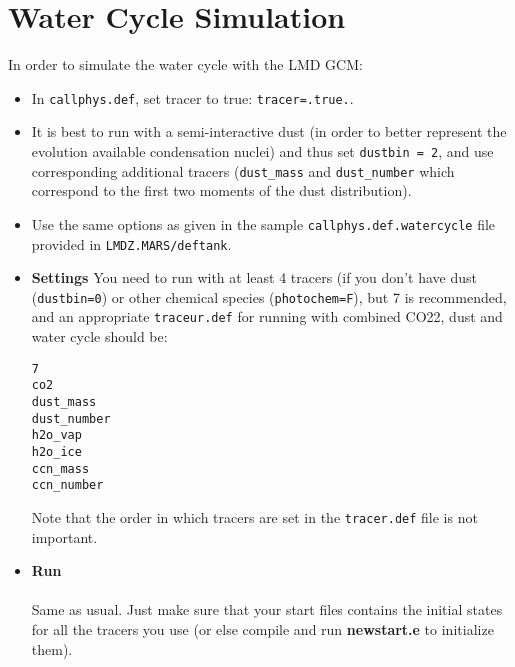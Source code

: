 \chapter{Water Cycle Simulation}

\label{sc:water}

In order to simulate the water cycle with the LMD GCM:

\begin{itemize}
\item In {\tt callphys.def}, set tracer to true: {\tt tracer=.true.}.

\item It is best to run with a semi-interactive dust (in order to
better represent the evolution available condensation nuclei) and thus set
{\tt dustbin = 2}, and use corresponding additional tracers ({\tt dust\_mass}
and {\tt dust\_number} which correspond to the first two moments of the dust
distribution).

\item Use the same options as given in the sample {\tt callphys.def.watercycle}
file provided in {\tt LMDZ.MARS/deftank}.

\item {\bf Settings}
You need to run with at least 4 tracers (if you don't have dust
({\tt dustbin=0}) or other chemical species ({\tt photochem=F}),
but 7 is recommended, and an appropriate {\tt traceur.def} for running with
combined CO22, dust and water cycle should be:
\begin{verbatim}
7
co2
dust_mass
dust_number
h2o_vap
h2o_ice
ccn_mass
ccn_number
\end{verbatim}
Note that the order in which tracers are set in the {\tt tracer.def} file
is not important.

\item {\bf Run} \\ \\
Same as usual. Just make sure that your start files contains
the initial states for all the tracers you use (or else compile
and run {\bf newstart.e} to initialize them).

\end {itemize}









 



